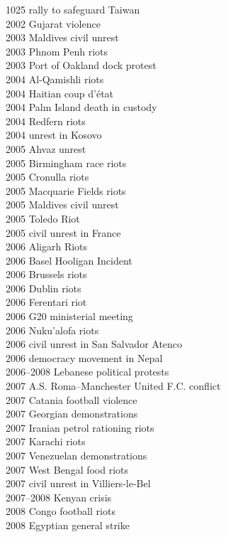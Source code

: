1025 rally to safeguard Taiwan\\
2002 Gujarat violence\\
2003 Maldives civil unrest\\
2003 Phnom Penh riots\\
2003 Port of Oakland dock protest\\
2004 Al-Qamishli riots\\
2004 Haitian coup d'état\\
2004 Palm Island death in custody\\
2004 Redfern riots\\
2004 unrest in Kosovo\\
2005 Ahvaz unrest\\
2005 Birmingham race riots\\
2005 Cronulla riots\\
2005 Macquarie Fields riots\\
2005 Maldives civil unrest\\
2005 Toledo Riot\\
2005 civil unrest in France\\
2006 Aligarh Riots\\
2006 Basel Hooligan Incident\\
2006 Brussels riots\\
2006 Dublin riots\\
2006 Ferentari riot\\
2006 G20 ministerial meeting\\
2006 Nuku'alofa riots\\
2006 civil unrest in San Salvador Atenco\\
2006 democracy movement in Nepal\\
2006–2008 Lebanese political protests\\
2007 A.S. Roma–Manchester United F.C. conflict\\
2007 Catania football violence\\
2007 Georgian demonstrations\\
2007 Iranian petrol rationing riots\\
2007 Karachi riots\\
2007 Venezuelan demonstrations\\
2007 West Bengal food riots\\
2007 civil unrest in Villiers-le-Bel\\
2007–2008 Kenyan crisis\\
2008 Congo football riots\\
2008 Egyptian general strike\\
